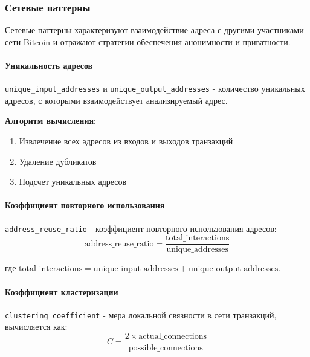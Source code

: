 \subsubsection{Сетевые паттерны}

Сетевые паттерны характеризуют взаимодействие адреса с другими участниками сети Bitcoin и отражают стратегии обеспечения анонимности и приватности.

\paragraph{Уникальность адресов}

\texttt{unique\_input\_addresses} и \texttt{unique\_output\_addresses} - количество уникальных адресов, с которыми взаимодействует анализируемый адрес.

\textbf{Алгоритм вычисления}:
\begin{enumerate}
    \item Извлечение всех адресов из входов и выходов транзакций
    \item Удаление дубликатов
    \item Подсчет уникальных адресов
\end{enumerate}

\paragraph{Коэффициент повторного использования}

\texttt{address\_reuse\_ratio} - коэффициент повторного использования адресов:
\begin{equation}
    \text{address\_reuse\_ratio} = \frac{\text{total\_interactions}}{\text{unique\_addresses}}
\end{equation}

где $\text{total\_interactions} = \text{unique\_input\_addresses} + \text{unique\_output\_addresses}$.

\paragraph{Коэффициент кластеризации}

\texttt{clustering\_coefficient} - мера локальной связности в сети транзакций, вычисляется как:
\begin{equation}
    C = \frac{2 \times \text{actual\_connections}}{\text{possible\_connections}}
\end{equation}

